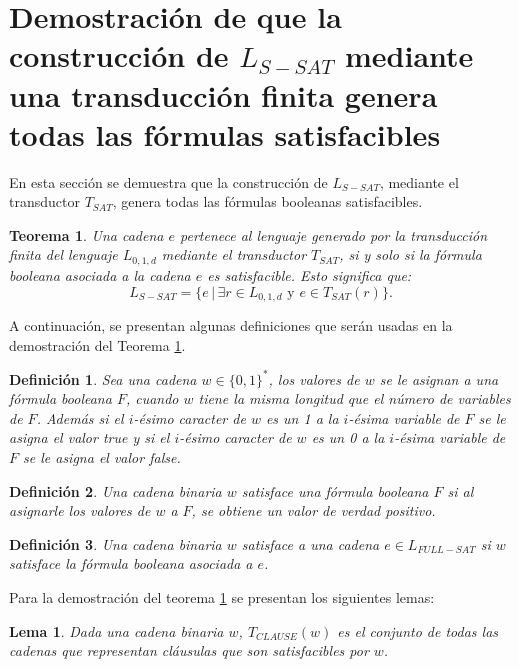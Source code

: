 \documentclass[12pt]{article}
\newtheorem{theorem}{Teorema}
\newtheorem{lemma}{Lema}
\newtheorem{definition}{Definición}
\newcommand{\true}{\textit{true}}
\newcommand{\false}{\textit{false}}
\begin{document}
\section{Demostración de que la construcción de $L_{S-SAT}$ mediante una transducción finita
  genera todas las fórmulas satisfacibles}

En esta sección se demuestra que la construcción de $L_{S-SAT}$, mediante el transductor $T_{SAT}$, genera todas las fórmulas booleanas satisfacibles.

\begin{theorem}
    \label{teo:tsat}
    Una cadena $e$ pertenece al lenguaje generado por la transducción finita del lenguaje $L_{0,1,d}$ mediante el transductor $T_{SAT}$, si y solo si la fórmula booleana asociada a la cadena $e$ es satisfacible. Esto significa que:
    $$L_{S-SAT} = \{e\,|\,\exists r \in L_{0,1,d} \text{ y } e \in T_{SAT}(r) \}.$$
\end{theorem}

A continuación, se presentan algunas definiciones que serán usadas en la demostración del Teorema \ref{teo:tsat}.

\begin{definition}
    Sea una cadena $w\in \{0,1\}^*$, los valores de $w$ se le asignan a una fórmula booleana $F$, cuando $w$ tiene la misma longitud
    que el número de variables de $F$. Además si el $i$-ésimo caracter de $w$ es un 1 a la $i$-ésima variable de $F$ se le asigna
    el valor \true{} y si el $i$-ésimo caracter de $w$ es un 0 a la $i$-ésima variable de $F$ se le asigna
    el valor \false{}.
\end{definition}

\begin{definition}
    Una cadena binaria $w$ satisface una fórmula booleana $F$ si al asignarle los valores de $w$ a $F$, se obtiene un valor de verdad positivo.
\end{definition}

\begin{definition}
    Una cadena binaria $w$ satisface a una cadena $e\in L_{FULL-SAT}$ si $w$ satisface la fórmula booleana asociada a $e$. 
\end{definition}

Para la demostración del teorema \ref{teo:tsat} se presentan los siguientes lemas:

\begin{lemma}
    \label{lem:clause}
    Dada una cadena binaria $w$, $T_{CLAUSE}(w)$ es el conjunto de todas las cadenas que representan cláusulas que son satisfacibles por $w$.
\end{lemma}
\end{document}
